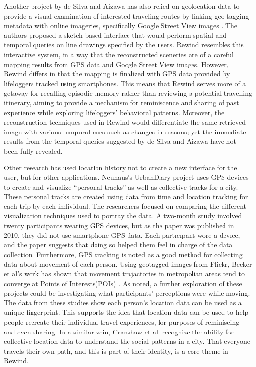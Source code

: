 \documentclass{sigchi}
\begin{document}
Another project by de Silva and Aizawa has also relied on geolocation data to provide a visual examination of interested traveling routes by linking geo-tagging metadata with online imageries, specifically Google Street View images \cite{deSilva:2009:RMT:1631272.1631414}. The authors proposed a sketch-based interface that would perform spatial and temporal queries on line drawings specified by the users. Rewind resembles this interactive system, in a way that the reconstructed sceneries are of a careful mapping results from GPS data and Google Street View images. However, Rewind differs in that the mapping is finalized with GPS data provided by lifeloggers tracked using smartphones. This means that Rewind serves more of a getaway for recalling episodic memory rather than reviewing a potential travelling itinerary, aiming to provide a mechanism for reminiscence and sharing of past experience while exploring lifeloggers' behavioral patterns. Moreover, the reconstruction techniques used in Rewind would differentiate the same retrieved image with various temporal cues such as changes in seasons; yet the immediate results from the temporal queries suggested by de Silva and Aizawa have not been fully revealed. 

Other research has used location history not to create a new interface for the user, but for other applications. Neuhaus's UrbanDiary project \cite{neuhaus2010urbandiary} uses GPS devices to create and visualize ``personal tracks'' as well as collective tracks for a city. These personal tracks are created using data from time and location tracking for each trip by each individual. The researchers focused on comparing the different visualization techniques used to portray the data. A two-month study involved twenty participants wearing GPS devices, but as the paper was published in 2010, they did not use smartphone GPS data. Each participant wore a device, and the paper suggests that doing so helped them feel in charge of the data collection. Furthermore, GPS tracking is noted as a good method for collecting data about movement of each person. Using geotagged images from Flickr, Becker et al's work has shown that movement trajactories in metropolian areas tend to converge at Points of Interests(POIs) \cite{Becker2015}. As noted, a further exploration of these projects could be investigating what participants' perceptions were while moving. The data from these studies show each person's location data can be used as a unique fingerprint. This supports the idea that location data can be used to help people recreate their individual travel experiences, for purposes of reminiscing and even sharing. In a similar vein, Cranshaw et al. \cite{cranshaw2012livehoods} recognize the ability for collective location data to understand the social patterns in a city. That everyone travels their own path, and this is part of their identity, is a core theme in Rewind.
\end{document}
